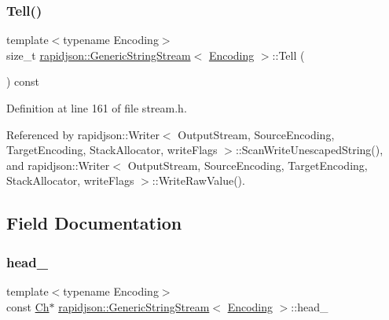 \subsubsection{\texorpdfstring{Tell()}{Tell()}}
{\footnotesize\ttfamily template$<$typename Encoding$>$ \\
size\+\_\+t \mbox{\hyperlink{structrapidjson_1_1_generic_string_stream}{rapidjson\+::\+Generic\+String\+Stream}}$<$ \mbox{\hyperlink{classrapidjson_1_1_encoding}{Encoding}} $>$\+::Tell (\begin{DoxyParamCaption}{ }\end{DoxyParamCaption}) const}



Definition at line 161 of file stream.\+h.


\begin{DoxyCode}{0}

\end{DoxyCode}


Referenced by rapidjson\+::\+Writer$<$ Output\+Stream, Source\+Encoding, Target\+Encoding, Stack\+Allocator, write\+Flags $>$\+::\+Scan\+Write\+Unescaped\+String(), and rapidjson\+::\+Writer$<$ Output\+Stream, Source\+Encoding, Target\+Encoding, Stack\+Allocator, write\+Flags $>$\+::\+Write\+Raw\+Value().



\subsection{Field Documentation}
\mbox{\label{structrapidjson_1_1_generic_string_stream_a2556705b0a0fd6393862efe6db025b32}} 
\subsubsection{\texorpdfstring{head\_}{head\_}}
{\footnotesize\ttfamily template$<$typename Encoding$>$ \\
const \mbox{\hyperlink{structrapidjson_1_1_generic_string_stream_a70ad06c96ddf8349be59f3d4f6bbadc8}{Ch}}$\ast$ \mbox{\hyperlink{structrapidjson_1_1_generic_string_stream}{rapidjson\+::\+Generic\+String\+Stream}}$<$ \mbox{\hyperlink{classrapidjson_1_1_encoding}{Encoding}} $>$\+::head\+\_\+}



